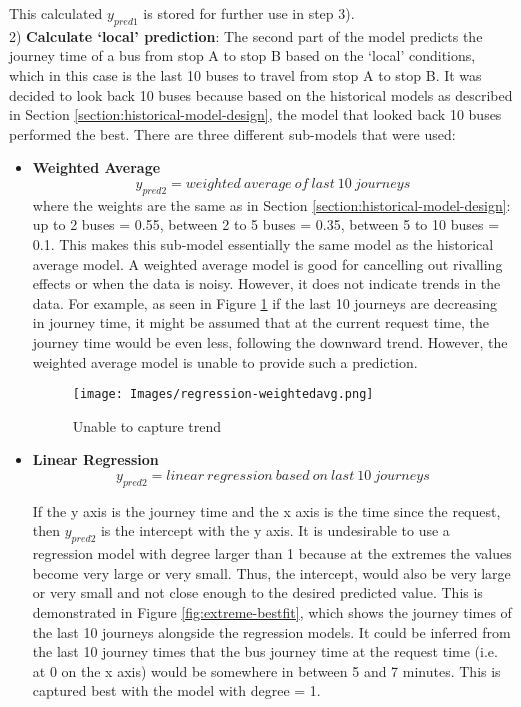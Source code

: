 This calculated $y_{pred1}$ is stored for further use in step 3). \\

2) \textbf{Calculate `local' prediction}: The second part of the model predicts the journey time of a bus from stop A to stop B based on the `local' conditions, which in this case is the last 10 buses to travel from stop A to stop B. It was decided to look back 10 buses because based on the historical models as described in Section \ref{section:historical-model-design}, the model that looked back 10 buses performed the best. There are three different sub-models that were used: \\

\begin{itemize}
    \item \textbf{Weighted Average}
    \begin{equation}
        y_{pred2} = weighted\ average\ of\ last\ 10\ journeys
    \end{equation}
    where the weights are the same as in Section \ref{section:historical-model-design}: up to 2 buses = 0.55, between 2 to 5 buses = 0.35, between 5 to 10 buses = 0.1. This makes this sub-model essentially the same model as the historical average model. A weighted average model is good for cancelling out rivalling effects or when the data is noisy. However, it does not indicate trends in the data. For example, as seen in Figure \ref{fig:weighted-avg-regression} if the last 10 journeys are decreasing in journey time, it might be assumed that at the current request time, the journey time would be even less, following the downward trend. However, the weighted average model is unable to provide such a prediction.
    
    \begin{figure}[H]
    \begin{center}
        \texttt{[image: Images/regression-weightedavg.png]}
        \caption{Unable to capture trend}
        \label{fig:weighted-avg-regression}
    \end{center}
    \end{figure}
    
    \item \textbf{Linear Regression}
    \begin{equation}
        y_{pred2} = linear\ regression\ based\ on\ last\ 10\ journeys
    \end{equation}
    
    If the y axis is the journey time and the x axis is the time since the request, then $y_{pred2}$ is the intercept with the y axis. It is undesirable to use a regression model with degree larger than 1 because at the extremes the values become very large or very small. Thus, the intercept, would also be very large or very small and not close enough to the desired predicted value. This is demonstrated in Figure \ref{fig:extreme-bestfit}, which shows the journey times of the last 10 journeys alongside the regression models. It could be inferred from the last 10 journey times that the bus journey time at the request time (i.e. at 0 on the x axis) would be somewhere in between 5 and 7 minutes. This is captured best with the model with degree = 1.
    

\end{itemize}
